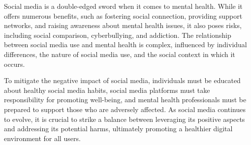 \documentclass[12pt]{article}
\begin{document}
Social media is a double-edged sword when it comes to mental health. While it offers numerous benefits, such as fostering social connection, providing support networks, and raising awareness about mental health issues, it also poses risks, including social comparison, cyberbullying, and addiction. The relationship between social media use and mental health is complex, influenced by individual differences, the nature of social media use, and the social context in which it occurs.

To mitigate the negative impact of social media, individuals must be educated about healthy social media habits, social media platforms must take responsibility for promoting well-being, and mental health professionals must be prepared to support those who are adversely affected. As social media continues to evolve, it is crucial to strike a balance between leveraging its positive aspects and addressing its potential harms, ultimately promoting a healthier digital environment for all users.
\end{document}

